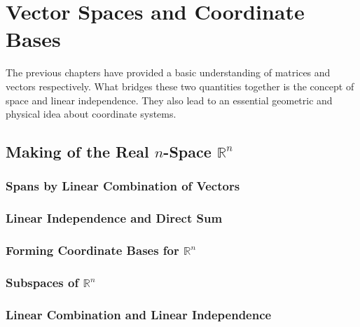 \chapter{Vector Spaces and Coordinate Bases}
\label{chap:6}

The previous chapters have provided a basic understanding of matrices and vectors respectively. What bridges these two quantities together is the concept of space and linear independence. They also lead to an essential geometric and physical idea about coordinate systems.

\section{Making of the Real $n$-Space $\mathbb{R}^n$}

\subsection{Spans by Linear Combination of Vectors}

\subsection{Linear Independence and Direct Sum}

\subsection{Forming Coordinate Bases for $\mathbb{R}^n$}

\subsection{Subspaces of $\mathbb{R}^n$}

\subsection*{Linear Combination and Linear Independence}
\label{6.1.1}

